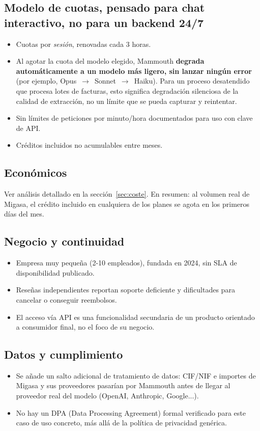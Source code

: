 \documentclass[11pt,a4paper]{article}
\begin{document}
\subsection{Modelo de cuotas, pensado para chat interactivo, no para un backend 24/7}
\begin{itemize}
    \item Cuotas por \emph{sesión}, renovadas cada 3 horas.
    \item Al agotar la cuota del modelo elegido, Mammouth \textbf{degrada
    automáticamente a un modelo más ligero, sin lanzar ningún error} (por
    ejemplo, Opus~$\rightarrow$~Sonnet~$\rightarrow$~Haiku). Para un proceso
    desatendido que procesa lotes de facturas, esto significa degradación
    silenciosa de la calidad de extracción, no un límite que se pueda capturar
    y reintentar.
    \item Sin límites de peticiones por minuto/hora documentados para uso con
    clave de API.
    \item Créditos incluidos no acumulables entre meses.
\end{itemize}

\subsection{Económicos}
Ver análisis detallado en la sección~\ref{sec:coste}. En resumen: al volumen real
de Migasa, el crédito incluido en cualquiera de los planes se agota en los
primeros días del mes.

\subsection{Negocio y continuidad}
\begin{itemize}
    \item Empresa muy pequeña (2-10 empleados), fundada en 2024, sin SLA de
    disponibilidad publicado.
    \item Reseñas independientes reportan soporte deficiente y dificultades
    para cancelar o conseguir reembolsos.
    \item El acceso vía API es una funcionalidad secundaria de un producto
    orientado a consumidor final, no el foco de su negocio.
\end{itemize}

\subsection{Datos y cumplimiento}
\begin{itemize}
    \item Se añade un salto adicional de tratamiento de datos: CIF/NIF e
    importes de Migasa y sus proveedores pasarían por Mammouth antes de llegar
    al proveedor real del modelo (OpenAI, Anthropic, Google...).
    \item No hay un DPA (Data Processing Agreement) formal verificado para este
    caso de uso concreto, más allá de la política de privacidad genérica.
\end{itemize}
\end{document}
